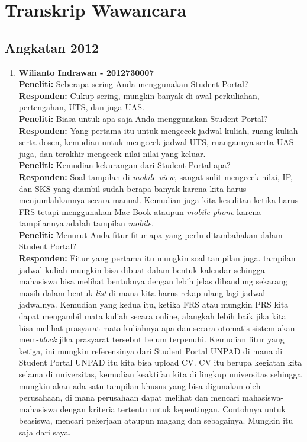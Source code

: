 \chapter{Transkrip Wawancara}

\section{Angkatan 2012}
\begin{enumerate}
	\item\textbf{Wilianto Indrawan - 2012730007}\\
	\textbf{Peneliti:} Seberapa sering Anda menggunakan Student Portal?\\
	\textbf{Responden:} Cukup sering, mungkin banyak di awal perkuliahan, pertengahan, UTS, dan juga UAS.\\ 
	\textbf{Peneliti:} Biasa untuk apa saja Anda menggunakan Student Portal?\\
	\textbf{Responden:} Yang pertama itu untuk mengecek jadwal kuliah, ruang kuliah serta dosen, kemudian untuk mengecek jadwal UTS, ruangannya serta UAS juga, dan terakhir mengecek nilai-nilai yang keluar.\\
	\textbf{Peneliti:} Kemudian kekurangan dari Student Portal apa?\\
	\textbf{Responden:} Soal tampilan di \textit{mobile view}, sangat sulit mengecek nilai, IP, dan SKS yang diambil sudah berapa banyak karena kita harus menjumlahkannya secara manual. Kemudian juga kita kesulitan ketika harus FRS tetapi menggunakan Mac Book ataupun \textit{mobile phone} karena tampilannya adalah tampilan \textit{mobile}.\\
	\textbf{Peneliti:} Menurut Anda fitur-fitur apa yang perlu ditambahakan dalam Student Portal?\\
	\textbf{Responden:} Fitur yang pertama itu mungkin soal tampilan juga. tampilan jadwal kuliah mungkin bisa dibuat dalam bentuk kalendar sehingga mahasiswa bisa melihat bentuknya dengan lebih jelas dibandung sekarang masih dalam bentuk \textit{list} di mana kita harus rekap ulang lagi jadwal-jadwalnya. Kemudian yang kedua itu, ketika FRS atau mungkin PRS kita dapat mengambil mata kuliah secara online, alangkah lebih baik jika kita bisa melihat prasyarat mata kuliahnya apa dan secara otomatis sistem akan mem-\textit{block} jika prasyarat tersebut belum terpenuhi. Kemudian fitur yang ketiga, ini mungkin referensinya dari Student Portal UNPAD di mana di Student Portal UNPAD itu kita bisa upload CV. CV itu berupa kegiatan kita selama di universitas, kemudian keaktifan kita di lingkup universitas sehingga mungkin akan ada satu tampilan khusus yang bisa digunakan oleh perusahaan, di mana perusahaan dapat melihat dan mencari mahasiswa-mahasiswa dengan kriteria tertentu untuk kepentingan. Contohnya untuk beasiswa, mencari pekerjaan ataupun magang dan sebagainya. Mungkin itu saja dari saya.\\


\end{enumerate}
